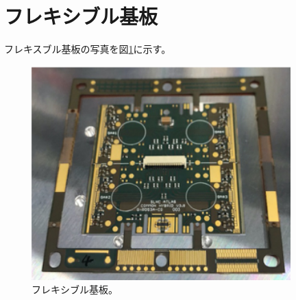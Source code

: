 \clearpage
\section{フレキシブル基板}
フレキスブル基板の写真を図\ref{pcb}に示す。
\begin{figure}[bpt]\centering
\includegraphics[width=10cm]{./pcb.png}
\caption[フレキシブル基板]{フレキシブル基板。}
\label{pcb}
\end{figure}


